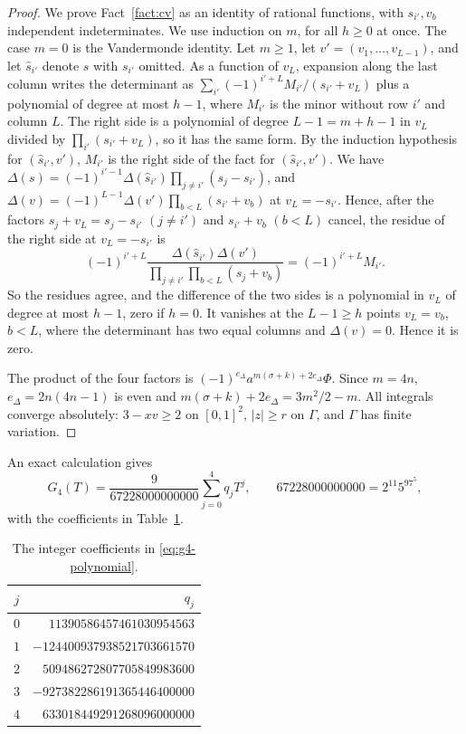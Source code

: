 \documentclass{amsart}
\numberwithin{equation}{section}
\numberwithin{table}{section}
\begin{document}
\begin{proof}
We prove Fact~\ref{fact:cv} as an identity of rational
functions, with $s_{i'},v_b$ independent indeterminates. We use induction on
$m$, for all $h\ge0$ at once. The case $m=0$ is the Vandermonde identity.
Let $m\ge1$, let $v'=(v_1,\ldots,v_{L-1})$, and let $\widehat s_{i'}$
denote $s$ with $s_{i'}$ omitted. As a function of $v_L$, expansion along the
last column writes the determinant as
$\sum_{i'}(-1)^{i'+L}M_{i'}/(s_{i'}+v_L)$ plus a polynomial of degree at most
$h-1$, where $M_{i'}$ is the minor without row $i'$ and column $L$. The right
side is a polynomial of degree $L-1=m+h-1$ in $v_L$ divided by
$\prod_{i'}(s_{i'}+v_L)$, so it has the same form. By the induction
hypothesis for $(\widehat s_{i'},v')$, $M_{i'}$ is the right side of the
fact for $(\widehat s_{i'},v')$. We have
$\Delta(s)=(-1)^{i'-1}\Delta(\widehat s_{i'})\prod_{j\ne i'}(s_j-s_{i'})$,
and $\Delta(v)=(-1)^{L-1}\Delta(v')\prod_{b<L}(s_{i'}+v_b)$ at
$v_L=-s_{i'}$. Hence, after the
factors $s_j+v_L=s_j-s_{i'}$ $(j\ne i')$ and $s_{i'}+v_b$ $(b<L)$ cancel,
the residue of the right side at $v_L=-s_{i'}$ is
\[
 (-1)^{i'+L}
 \frac{\Delta(\widehat s_{i'})\Delta(v')}
 {\prod_{j\ne i'}\prod_{b<L}(s_j+v_b)}=(-1)^{i'+L}M_{i'}.
\]
So the residues agree, and the difference of the two sides is a polynomial
in $v_L$ of degree at most $h-1$, zero if $h=0$. It vanishes at the
$L-1\ge h$ points $v_L=v_b$, $b<L$, where the determinant has two equal
columns and $\Delta(v)=0$. Hence it is zero.

The product of the four factors is
$(-1)^{e_\Delta}a^{m(\sigma+k)+2e_\Delta}\Phi$. Since
$m=4n$, $e_\Delta=2n(4n-1)$ is even and
$m(\sigma+k)+2e_\Delta=3m^2/2-m$. All integrals converge absolutely:
$3-xv\ge2$ on $[0,1]^2$, $|z|\ge r$ on $\Gamma$, and $\Gamma$ has finite
variation.
\end{proof}

An exact calculation gives
\begin{equation}\label{eq:g4-polynomial}
G_4(T)=\frac{9}{67228000000000}\sum_{j=0}^4q_jT^j,\qquad
67228000000000=2^{11}5^97^5,
\end{equation}
with the coefficients in Table~\ref{tab:g4-coefficients}.
\begin{table}[!ht]
\centering
\caption{The integer coefficients in \eqref{eq:g4-polynomial}.}
\label{tab:g4-coefficients}
\begin{tabular}{cr}
$j$&$q_j$\\\hline
$0$ & $11390586457461030954563$\\
$1$ & $-124400937938521703661570$\\
$2$ & $509486272807705849983600$\\
$3$ & $-927382286191365446400000$\\
$4$ & $633018449291268096000000$\\
\end{tabular}
\end{table}
\end{document}
